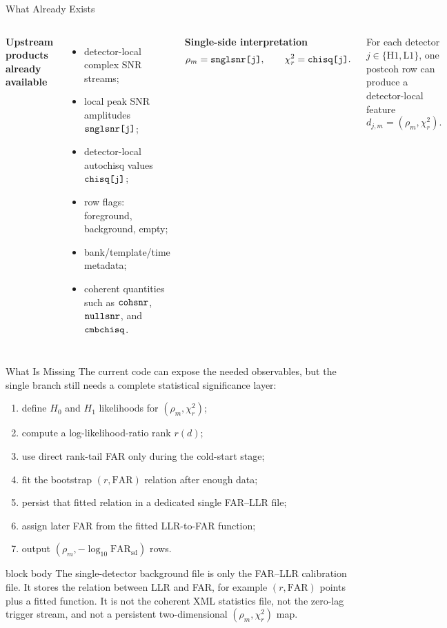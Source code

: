 \documentclass[aspectratio=169,10pt]{beamer}
\newcommand{\code}[1]{\ifmmode\text{\ttfamily\detokenize{#1}}\else\texttt{\detokenize{#1}}\fi}
\newcommand{\proposal}[1]{\begin{beamercolorbox}[rounded=true,wd=\textwidth,sep=0.8em]{block body}\small #1\end{beamercolorbox}}
\begin{document}
\begin{frame}{What Already Exists}
\small
\begin{columns}[T,onlytextwidth]
\textbf{Upstream products already available}
\begin{itemize}
  \item detector-local complex SNR streams;
  \item local peak SNR amplitudes \(\code{snglsnr[j]}\);
  \item detector-local autochisq values \(\code{chisq[j]}\);
  \item row flags: foreground, background, empty;
  \item bank/template/time metadata;
  \item coherent quantities such as \(\code{cohsnr}\), \(\code{nullsnr}\), and \(\code{cmbchisq}\).
\end{itemize}

\textbf{Single-side interpretation}
\[
\rho_m=\code{snglsnr[j]},
\qquad
\chi_r^2=\code{chisq[j]}.
\]

For each detector \(j\in\{\mathrm{H1},\mathrm{L1}\}\), one postcoh row can produce a detector-local feature
\[
d_{j,m}=(\rho_m,\chi_r^2).
\]
\end{columns}
\end{frame}

\begin{frame}{What Is Missing}
\small
The current code can expose the needed observables, but the single branch still needs a complete statistical significance layer:
\begin{enumerate}
  \item define \(H_0\) and \(H_1\) likelihoods for \((\rho_m,\chi_r^2)\);
  \item compute a log-likelihood-ratio rank \(r(d)\);
  \item use direct rank-tail FAR only during the cold-start stage;
  \item fit the bootstrap \((r,\mathrm{FAR})\) relation after enough data;
  \item persist that fitted relation in a dedicated single FAR--LLR file;
  \item assign later FAR from the fitted LLR-to-FAR function;
  \item output \((\rho_m,-\log_{10}\mathrm{FAR}_{\mathrm{sd}})\) rows.
\end{enumerate}

\proposal{
The single-detector background file is only the FAR--LLR calibration file.  It stores the relation between LLR and FAR, for example \((r,\mathrm{FAR})\) points plus a fitted function.  It is not the coherent XML statistics file, not the zero-lag trigger stream, and not a persistent two-dimensional \((\rho_m,\chi_r^2)\) map.
}
\end{frame}
\end{document}
